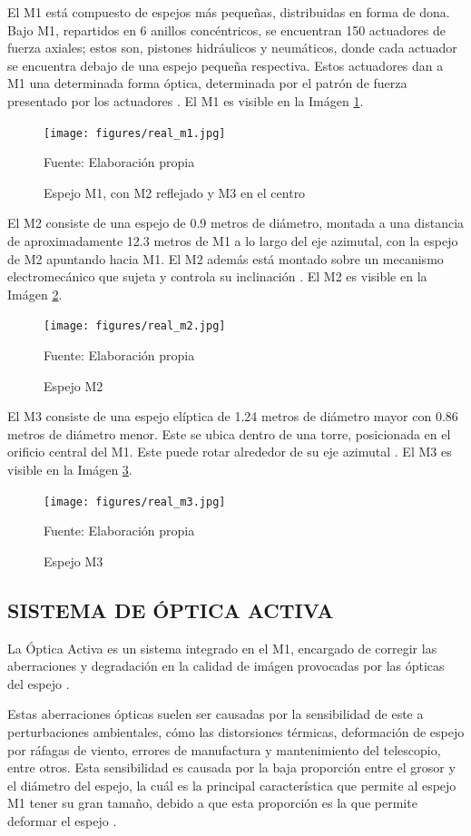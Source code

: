 El M1 está compuesto de espejos más pequeñas, distribuidas en forma de dona. Bajo M1, repartidos en 6 anillos concéntricos, se encuentran 150 actuadores de fuerza axiales; estos son, pistones hidráulicos y neumáticos, donde cada actuador se encuentra debajo de una espejo pequeña respectiva. Estos actuadores dan a M1 una determinada forma óptica, determinada por el patrón de fuerza presentado por los actuadores \cite{eso1998vlt}. El M1 es visible en la Imágen \ref{fig:real_m1}.

\begin{figure}[h]
\centering
\texttt{[image: figures/real\_m1.jpg]}
\caption{\label{fig:real_m1} Espejo M1, con M2 reflejado y M3 en el centro} Fuente: Elaboración propia
\end{figure}

El M2 consiste de una espejo de 0.9 metros de diámetro, montada a una distancia de aproximadamente 12.3 metros de M1 a lo largo del eje azimutal, con la espejo de M2 apuntando hacia M1. El M2 además está montado sobre un mecanismo electromecánico que sujeta y controla su inclinación \cite{eso2011m2}. El M2 es visible en la Imágen \ref{fig:real_m2}.

\begin{figure}[h]
\centering
\texttt{[image: figures/real\_m2.jpg]}
\caption{\label{fig:real_m2} Espejo M2} Fuente: Elaboración propia
\end{figure}

El M3 consiste de una espejo elíptica de 1.24 metros de diámetro mayor con 0.86 metros de diámetro menor. Este se ubica dentro de una torre, posicionada en el orificio central del M1. Este puede rotar alrededor de su eje azimutal \cite{eso2011m1}. El M3 es visible en la Imágen \ref{fig:real_m3}.

\begin{figure}[h]
\centering
\texttt{[image: figures/real\_m3.jpg]}
\caption{\label{fig:real_m3} Espejo M3} Fuente: Elaboración propia
\end{figure}

\subsection{SISTEMA DE ÓPTICA ACTIVA}
La Óptica Activa es un sistema integrado en el M1, encargado de corregir las aberraciones y degradación en la calidad de imágen provocadas por las ópticas del espejo \cite{eso1998vlt}.

Estas aberraciones ópticas suelen ser causadas por la sensibilidad de este a perturbaciones ambientales, cómo las distorsiones térmicas, deformación de espejo por ráfagas de viento, errores de manufactura y mantenimiento del telescopio, entre otros. Esta sensibilidad es causada por la baja proporción entre el grosor y el diámetro del espejo, la cuál es la principal característica que permite al espejo M1 tener su gran tamaño, debido a que esta proporción es la que permite deformar el espejo \cite{wilson1987active}.

